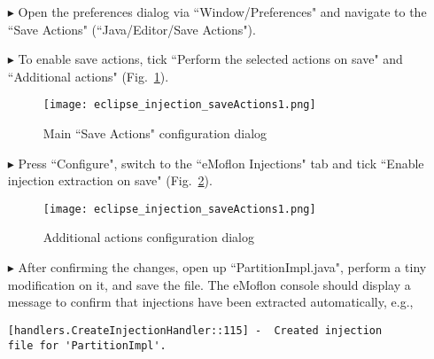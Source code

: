 \begin{itemize}

\item[$\blacktriangleright$] 
Open the preferences dialog via ``Window/Preferences" and navigate to the ``Save Actions" (``Java/Editor/Save Actions").

\item[$\blacktriangleright$]
To enable save actions, tick ``Perform the selected actions on save" and ``Additional actions" (Fig.~\ref{eclipse:injection_saveActions1}).

\begin{figure}[htbp]
    \centering
    \texttt{[image: eclipse\_injection\_saveActions1.png]}
    \caption{Main ``Save Actions" configuration dialog}
    \label{eclipse:injection_saveActions1}
\end{figure}

\item[$\blacktriangleright$]
Press ``Configure", switch to the ``eMoflon Injections" tab and tick ``Enable injection extraction on save" (Fig.~\ref{eclipse:injection_saveActions2}).

\begin{figure}[htbp]
    \centering
    \texttt{[image: eclipse\_injection\_saveActions1.png]}
    \caption{Additional actions configuration dialog}
    \label{eclipse:injection_saveActions2}
\end{figure}

\item[$\blacktriangleright$]
After confirming the changes, open up ``PartitionImpl.java", perform a tiny modification on it, and save the file.
The eMoflon console should display a message to confirm that injections have been extracted automatically, e.g.,
\begin{verbatim}
[handlers.CreateInjectionHandler::115] -  Created injection
file for 'PartitionImpl'.
\end{verbatim}

\end{itemize}

